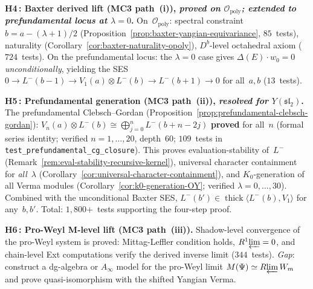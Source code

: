 \begin{remark}
\smallskip\noindent
\textbf{H4\,: Baxter derived lift (MC3 path~\textup{(i)}),
\emph{proved on $\mathcal{O}_{\mathrm{poly}}$;
extended to prefundamental locus at $\lambda = 0$}.}
On~$\mathcal{O}_{\mathrm{poly}}$:
spectral constraint $b = a - (\lambda+1)/2$
(Proposition~\ref{prop:baxter-yangian-equivariance}, $85$~tests),
naturality (Corollary~\ref{cor:baxter-naturality-opoly}),
$D^b$-level octahedral axiom ($724$~tests).
On the prefundamental locus: the $\lambda = 0$ case gives
$\Delta(E) \cdot w_0 = 0$ \emph{unconditionally}, yielding the SES
$0 \to L^-(b{-}1) \to V_1(a) \otimes L^-(b) \to L^-(b{+}1) \to 0$
for all~$a, b$ ($13$~tests).

\smallskip\noindent
\textbf{H5\,: Prefundamental generation (MC3 path~\textup{(ii)}),
\emph{resolved for $Y(\mathfrak{sl}_2)$}.}
The prefundamental Clebsch--Gordan
(Proposition~\ref{prop:prefundamental-clebsch-gordan}):
$V_n(a) \otimes L^-(b) \cong \bigoplus_{j=0}^{n} L^-(b{+}n{-}2j)$
\textbf{proved} for all~$n$ (formal series identity; verified
$n = 1, \ldots, 20$, depth~$60$;
$109$~tests in \texttt{test\_prefundamental\_cg\_closure}).
This proves evaluation-stability of~$L^-$
(Remark~\ref{rem:eval-stability-recursive-kernel}),
universal character containment for \emph{all}~$\lambda$
(Corollary~\ref{cor:universal-character-containment}),
and $K_0$-generation of all Verma modules
(Corollary~\ref{cor:k0-generation-OY}; verified
$\lambda = 0, \ldots, 30$).
Combined with the unconditional Baxter SES,
$L^-(b') \in \operatorname{thick}\langle L^-(b), V_1\rangle$ for
any~$b, b'$.
Total: $1{,}800$+~tests supporting the four-step proof.

\smallskip\noindent
\textbf{H6\,: Pro-Weyl M-level lift (MC3 path~\textup{(iii)}).}
Shadow-level convergence of the pro-Weyl system is proved:
Mittag-Leffler condition holds, $R^1\!\varprojlim = 0$, and
chain-level Ext computations verify the derived inverse limit
($344$~tests). \emph{Gap}: construct a dg-algebra or
$A_\infty$ model for the pro-Weyl limit
$M(\Psi) \simeq R\!\varprojlim W_m$ and prove quasi-isomorphism
with the shifted Yangian Verma.


\end{remark}
